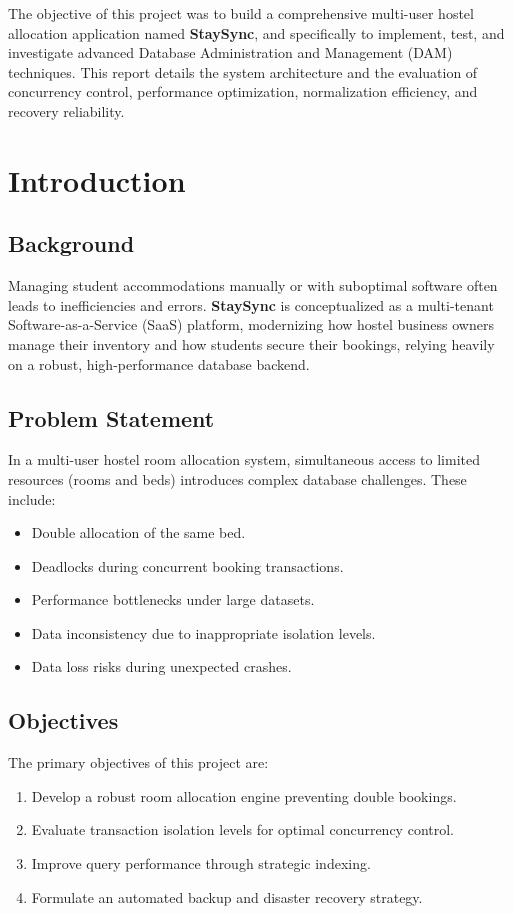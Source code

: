 \documentclass[12pt, a4paper]{report}
\begin{document}
The objective of this project was to build a comprehensive multi-user hostel allocation application named \textbf{StaySync}, and specifically to implement, test, and investigate advanced Database Administration and Management (DAM) techniques. This report details the system architecture and the evaluation of concurrency control, performance optimization, normalization efficiency, and recovery reliability.

\tableofcontents
\newpage
\listoffigures
\newpage
\listoftables
\newpage


\chapter{Introduction}
\section{Background}
Managing student accommodations manually or with suboptimal software often leads to inefficiencies and errors. \textbf{StaySync} is conceptualized as a multi-tenant Software-as-a-Service (SaaS) platform, modernizing how hostel business owners manage their inventory and how students secure their bookings, relying heavily on a robust, high-performance database backend.

\section{Problem Statement}
In a multi-user hostel room allocation system, simultaneous access to limited resources (rooms and beds) introduces complex database challenges. These include:
\begin{itemize}
    \item Double allocation of the same bed.
    \item Deadlocks during concurrent booking transactions.
    \item Performance bottlenecks under large datasets.
    \item Data inconsistency due to inappropriate isolation levels.
    \item Data loss risks during unexpected crashes.
\end{itemize}

\section{Objectives}
The primary objectives of this project are:
\begin{enumerate}
    \item Develop a robust room allocation engine preventing double bookings.
    \item Evaluate transaction isolation levels for optimal concurrency control.
    \item Improve query performance through strategic indexing.
    \item Formulate an automated backup and disaster recovery strategy.
\end{enumerate}
\end{document}
